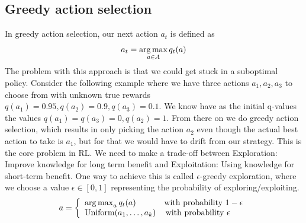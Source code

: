 \subsection{Greedy action selection}
In greedy action selection, our next action $a_t$ is defined as $$a_t = \operatorname*{arg\,max}\limits_{a\in 
A} q_t(a)$$ The problem with this approach is that we could get stuck in a suboptimal 
policy. Consider the following example where we have three actions $a_1,a_2,a_3$ to choose 
from with unknown true rewards ${q(a_1)=0.95,q(a_2)=0.9,q(a_3)=0.1}$. We know have as the 
initial q-values the values \newline ${q(a_1)= q(a_3) = 0,q(a_2)=1}$. From there on we do 
greedy action selection, which results in only picking the action $a_2$ even though the 
actual best action to take is $a_1$, but for that we would have to drift from our strategy. 
This is the core problem in RL. We need to make a trade-off between Exploration: Improve 
knowledge for long term benefit and Exploitation: Using knowledge for short-term benefit. 
One way to achieve this is called $\epsilon$-greedy exploration, 
where we choose a value $\epsilon \in [0,1]$ representing the probability of 
exploring/exploiting.
$$ a = \left\{
\begin{array}{ll}
\operatorname*{arg\,max}_a q_t(a) & \text{with probability } 1-\epsilon \\
\text{Uniform}({a_1,\dots,a_k}) & \, \text{with probability } \epsilon\\
\end{array}
\right.$$

